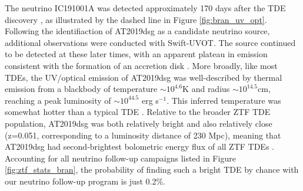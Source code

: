 \documentclass[a4paper,11pt]{article}
\begin{document}
The neutrino IC191001A was detected approximately 170 days after the TDE discovery \cite{bran}, as illustrated by the dashed line in Figure \ref{fig:bran_uv_opt}. Following the identifiaction of AT2019dsg as a candidate neutrino source, additional observations were conducted with Swift-UVOT. The source continued to be detected at these later times, with an apparent plateau in emission consistent with the formation of an accretion disk \cite{bran}. More broadly, like most TDEs, the UV/optical emission of AT2019dsg was well-described by thermal emission from a blackbody of temperature $\sim10^{4.6}$K and radius $\sim10^{14.5}$cm, reaching a peak luminosity of $\sim10^{44.5}$ erg s$^{-1}$. This inferred temperature was somewhat hotter than a typical TDE \cite{van_velzen_20}. Relative to the broader ZTF TDE population, AT2019dsg was both relatively bright and also relatively close (z=0.051, corresponding to a luminosity distance of 230 Mpc), meaning that AT2019dsg had second-brightest bolometric energy flux of all ZTF TDEs \cite{van_velzen_20}. Accounting for all neutrino follow-up campaigns listed in Figure \ref{fig:ztf_stats_bran}, the probability of finding such a bright TDE by chance with our neutrino follow-up program is just 0.2\%.
\end{document}
